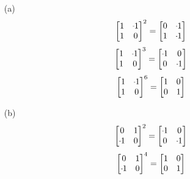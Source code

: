 \begin{mdframed}[style=darkAnswer,frametitle={Joe Starr}]
\begin{multicols}{2}
\begin{itemize}
\item[(a)]{
    $$\begin{bmatrix}1 & \m 1 \\
      1 & 0 \\
      \end{bmatrix}^2=\begin{bmatrix}0 & \m 1 \\
      1 & \m 1\\
      \end{bmatrix}$$
    $$\begin{bmatrix}1 & \m 1 \\
      1 & 0 \\
      \end{bmatrix}^3=\begin{bmatrix}\m 1 & 0 \\
      0 & \m 1\\
      \end{bmatrix}$$
    $$\begin{bmatrix}1 & \m 1 \\
      1 & 0 \\
      \end{bmatrix}^6=\begin{bmatrix}1 & 0 \\
      0 & 1\\
      \end{bmatrix}$$
  }
\item[(b)]{
    $$\begin{bmatrix}0 & 1 \\
      \m 1 & 0 \\
      \end{bmatrix}^2=\begin{bmatrix}\m 1 & 0 \\
      0 & \m 1\\
      \end{bmatrix}$$
    $$\begin{bmatrix}0 & 1 \\
      \m 1 & 0 \\
      \end{bmatrix}^4=\begin{bmatrix}1 & 0 \\
      0 & 1\\

\end{bmatrix}$$}
\end{itemize}
\end{multicols}
\end{mdframed}
